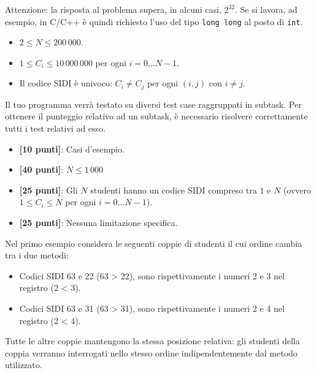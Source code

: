 \begin{warning}
    Attenzione: la risposta al problema supera, in alcuni casi, $2^{32}$. Se si lavora, ad esempio, in C/C++ è quindi richiesto l'uso del tipo \texttt{long long} al posto di \texttt{int}.
\end{warning}


\Constraints
\begin{itemize}[nolistsep, itemsep=2mm]
    \item $2 \le N \le 200\,000$.
    \item $1 \le C_i \le 10\,000\,000$ per ogni $i=0\ldots N-1$.
    \item Il codice SIDI è univoco: $C_i \ne C_j$ per ogni $(i, j)$ con $i \ne j$.
\end{itemize}

\pagebreak
\Scoring
Il tuo programma verrà testato su diversi test case raggruppati in subtask.
Per ottenere il punteggio relativo ad un subtask, è necessario risolvere
correttamente tutti i test relativi ad esso.

\begin{itemize}[nolistsep,itemsep=2mm]
  \item \textbf{ [10 punti]}: Casi d'esempio.
  \item \textbf{ [40 punti]}: $N \leq 1\,000$
  \item \textbf{ [25 punti]}: Gli $N$ studenti hanno un codice SIDI compreso tra $1$ e $N$ (ovvero $1 \le C_i \le N$ per ogni $i=0\ldots N-1$).
  \item \textbf{ [25 punti]}: Nessuna limitazione specifica.
\end{itemize}

\Examples
\begin{example}
%
\end{example}
\begin{example}
%
\end{example}

\Explanation
Nel primo esempio considera le seguenti coppie di studenti il cui ordine cambia tra i due metodi:
\begin{itemize}
    \item Codici SIDI 63 e 22 (63 > 22), sono rispettivamente i numeri 2 e 3 nel registro (2 < 3).
    \item Codici SIDI 63 e 31 (63 > 31), sono rispettivamente i numeri 2 e 4 nel registro (2 < 4).
\end{itemize}
Tutte le altre coppie mantengono la stessa posizione relativa: gli studenti della coppia verranno interrogati nello stesso ordine indipendentemente dal metodo utilizzato.
